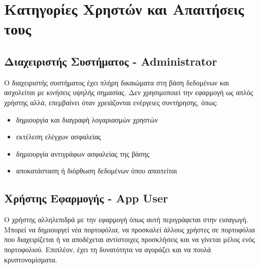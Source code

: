\section{Κατηγορίες Χρηστών και Απαιτήσεις τους}

\subsection*{Διαχειριστής Συστήματος - Administrator}
Ο διαχειριστής συστήματος έχει πλήρη δικαιώματα στη βάση δεδομένων και ασχολείται με κινήσεις υψηλής σημασίας. Δεν χρησιμοποιεί την εφαρμογή ως απλός χρήστης αλλά, επεμβαίνει όταν χρειάζονται ενέργειες συντήρησης, όπως:
\begin{itemize}
\item δημιουργία και διαγραφή λογαριασμών χρηστών
\item εκτέλεση ελέγχων ασφαλείας
\item δημιουργία αντιγράφων ασφαλείας της βάσης
\item αποκατάσταση ή διόρθωση δεδομένων όπου απαιτείται
\end{itemize}


\subsection*{Χρήστης Εφαρμογής - App User}
Ο χρήστης αλληλεπιδρά με την εφαρμογή όπως αυτή περιγράφεται στην εισαγωγή. 
Μπορεί να δημιουργεί νέα πορτοφόλια, να προσκαλεί άλλους χρήστες σε πορτοφόλια που διαχειρίζεται ή να αποδέχεται αντίστοιχες προσκλήσεις και να γίνεται μέλος ενός πορτοφολιού. 
Επιπλέον, έχει τη δυνατότητα να αγοράζει και να πουλά κρυπτονομίσματα.

